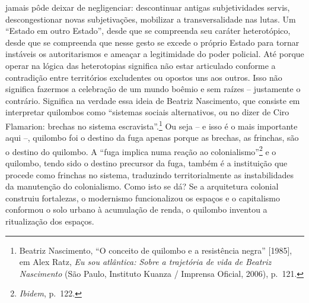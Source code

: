 jamais pôde deixar de negligenciar: descontinuar antigas subjetividades
servis, descongestionar novas subjetivações, mobilizar a
transversalidade nas lutas. Um ``Estado em outro Estado'', desde que se
compreenda seu caráter heterotópico, desde que se compreenda que nesse
gesto se excede o próprio Estado para tornar instáveis os autoritarismos
e ameaçar a legitimidade do poder policial. Até porque operar na lógica
das heterotopias significa não estar articulado conforme a contradição
entre territórios excludentes ou opostos uns aos outros. Isso não
significa fazermos a celebração de um mundo boêmio e sem raízes --
justamente o contrário. Significa na verdade essa ideia de Beatriz
Nascimento, que consiste em interpretar quilombos como ``sistemas
sociais alternativos, ou no dizer de Ciro Flamarion: brechas no sistema
escravista''.\footnote{Beatriz Nascimento, ``O conceito de quilombo e a
  resistência negra'' {[}1985{]}, em Alex Ratz, \emph{Eu sou atlântica:
  Sobre a trajetória de vida de Beatriz Nascimento} (São Paulo,
  Instituto Kuanza / Imprensa Oficial, 2006), p.~121.} Ou seja -- e isso
é o mais importante aqui --, quilombo foi o destino da fuga apenas
porque as brechas, as frinchas, são o destino do quilombo. A ``fuga
implica numa reação ao colonialismo''\footnote{\emph{Ibidem}, p.~122.} e
o quilombo, tendo sido o destino precursor da fuga, também é a
instituição que procede como frinchas no sistema, traduzindo
territorialmente as instabilidades da manutenção do colonialismo. Como
isto se dá? Se a arquitetura colonial construiu fortalezas, o modernismo
funcionalizou os espaços e o capitalismo conformou o solo urbano à
acumulação de renda, o quilombo inventou a ritualização dos espaços.

